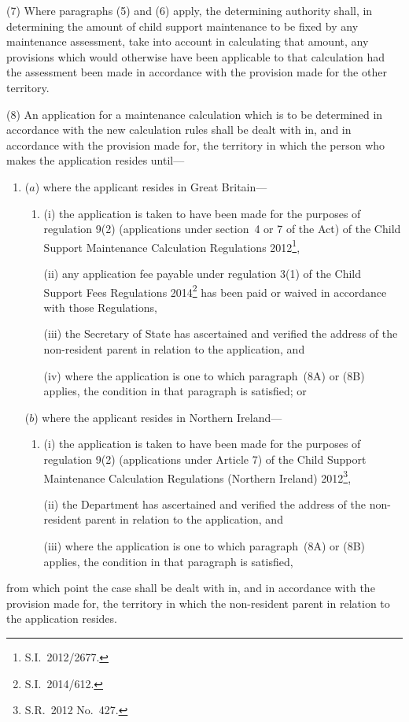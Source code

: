\documentclass[12pt,a4paper]{article}
\begin{document}
(7) Where paragraphs (5) and (6) apply, the determining authority shall, in determining the amount of child support maintenance to be fixed by any maintenance assessment, take into account in calculating that amount, any provisions which would otherwise have been applicable to that calculation had the assessment been made in accordance with the provision made for the other territory.


(8) An application for a maintenance calculation which is to be determined in
accordance with the new calculation rules shall be dealt with in, and in accordance
with the provision made for, the territory in which the person who makes the
application resides until---
\begin{enumerate}\item[]
($a$) where the applicant resides in Great Britain---
\begin{enumerate}\item[]
(i) the application is taken to have been made for the purposes of
regulation 9(2) (applications under section~4 or 7 of the Act) of the
Child Support Maintenance Calculation Regulations 2012\footnote{S.I.~2012/2677.},

(ii) any application fee payable under regulation 3(1) of the Child Support Fees Regulations 2014\footnote{S.I.~2014/612.} has been paid or waived in accordance with those Regulations,

(iii) the Secretary of State has ascertained and verified the address of the
non-resident parent in relation to the application, and

(iv) where the application is one to which paragraph~(8A) or (8B) applies,
the condition in that paragraph is satisfied; or
\end{enumerate}

($b$) where the applicant resides in Northern Ireland---
\begin{enumerate}\item[]
(i) the application is taken to have been made for the purposes of
regulation 9(2) (applications under Article 7) of the Child Support
Maintenance Calculation Regulations (Northern Ireland) 2012\footnote{S.R.~2012 No.~427.},

(ii) the Department has ascertained and verified the address of the non-%
resident parent in relation to the application, and

(iii) where the application is one to which paragraph~(8A) or (8B) applies,
the condition in that paragraph is satisfied,
\end{enumerate}
\end{enumerate}
from which point the case shall be dealt with in, and in accordance with the
provision made for, the territory in which the non-resident parent in relation to the 
application resides.
\end{document}
